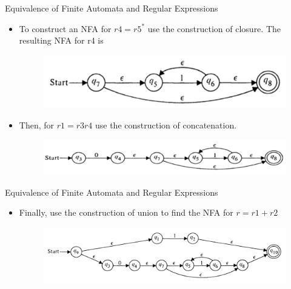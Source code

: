 \documentclass{beamer}
\begin{document}
\begin{frame}{Equivalence of Finite Automata and Regular Expressions}
	\begin{itemize}
		\item To construct an NFA for $r4 = r5^*$ use the construction of closure. The 
		resulting NFA for r4 is
		\begin{figure}
			\includegraphics[scale=.5]{img2/m6}
		\end{figure}
	\item Then, for $r1 = r3 r4$ use the construction of concatenation.
	\begin{figure}
		\includegraphics[scale=.3]{img2/m7}
	\end{figure}
	\end{itemize}
\end{frame}
\begin{frame}{Equivalence of Finite Automata and Regular Expressions}
	\begin{itemize}
		\item Finally, use the construction of union to find the NFA for $r = r1 + r2$
		\begin{figure}
			\includegraphics[scale=.3]{img2/m8}
		\end{figure}
	\end{itemize}
\end{frame}
\end{document}
